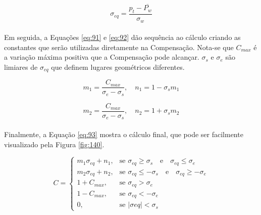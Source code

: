 \begin{equation} \label{eq:90}
    \sigma_{eq} = \dfrac{p_t - \overline{P_w}}{\sigma_w}
\end{equation}

\paragraph{} Em seguida, a Equações \ref{eq:91} e \ref{eq:92} dão sequência ao cálculo criando as constantes que serão utilizadas diretamente na Compensação. Nota-se que \begin{math} C_{max} \end{math} é a variação máxima positiva que a Compensação pode alcançar. \begin{math} \sigma_s \end{math} e \begin{math} \sigma_e \end{math} são limiares de \begin{math} \sigma_{eq} \end{math} que definem lugares geométricos diferentes.

\begin{equation} \label{eq:91}
    m_1 = \dfrac{ C_{max} }{ \sigma_e - \sigma_s }, \quad n_1 = 1 - \sigma_s m_1
\end{equation}

\begin{equation} \label{eq:92}
    m_2 = \dfrac{ C_{max} }{ \sigma_e - \sigma_s }, \quad n_2 = 1 + \sigma_s m_2
\end{equation}

\paragraph{} Finalmente, a Equação \ref{eq:93} mostra o cálculo final, que pode ser facilmente visualizado pela Figura \ref{fig:140}.

\begin{equation} \label{eq:93}
    C = \begin{cases} m_1 \sigma_{eq} + n_1, & \mbox{se } \sigma_{eq} \ge \sigma_s \quad \textrm{e} \quad \sigma_{eq} \le \sigma_e \\ m_2 \sigma_{eq} + n_2, & \mbox{se } \sigma_{eq} \le - \sigma_s \quad \textrm{e} \quad \sigma_{eq} \ge - \sigma_e \\ 1 + C_{max}, & \mbox{se } \sigma_{eq} > \sigma_e \\ 1 - C_{max}, & \mbox{se } \sigma_{eq} < - \sigma_e \\ 0, & \mbox{se } |\sigma{eq}| < \sigma_s \end{cases}
\end{equation}

